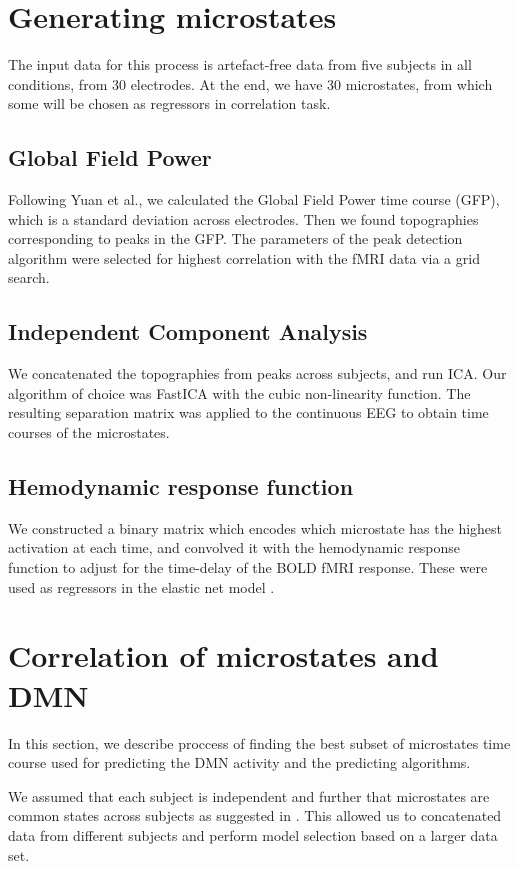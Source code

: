 \documentclass{article}
\begin{document}
\section{Generating microstates}
The input data for this process is artefact-free data from five subjects in all conditions, from 30 electrodes. At the end, we have 30 microstates, from which some will be chosen as regressors in correlation task. 
\subsection{Global Field Power}
Following Yuan et al., we calculated the Global Field Power time course (GFP), which is a standard deviation across electrodes. Then we found topographies corresponding to peaks in the GFP. The parameters of the peak detection algorithm were selected for highest correlation with the fMRI data via a grid search.
\subsection{Independent Component Analysis}
We concatenated the topographies from peaks across subjects, and run ICA. Our algorithm of choice was FastICA \cite{fast_robust} with the cubic non-linearity function. The resulting separation matrix was applied to the continuous EEG to obtain time courses of the microstates.
\subsection{Hemodynamic response function}   
We constructed a binary matrix which encodes which microstate has the highest activation at each time, and convolved it with the hemodynamic response function to adjust for the time-delay of the BOLD fMRI response. These were used as regressors in the elastic net model \cite{hastie01}. 

\section{Correlation of microstates and DMN}
In this section, we describe proccess of finding the best subset of microstates time course used for predicting the DMN activity and the predicting algorithms.

We assumed that each subject is independent and further that microstates are common states across subjects as suggested in \cite{Yuan20122062}. This allowed us to concatenated data from different subjects and perform model selection based on a larger data set.
\end{document}
